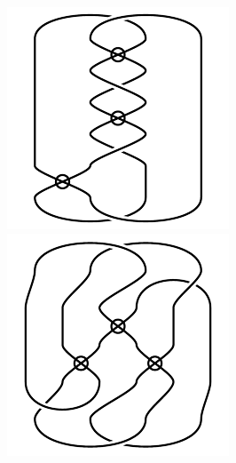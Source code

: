 \begin{figure}[H]
\begin{minipage}[b]{.18\linewidth}
\centering
\includegraphics[width=\linewidth]{../data/virtual_4_47.png}
\end{minipage}
\begin{minipage}[b]{.18\linewidth}
\centering
\includegraphics[width=\linewidth]{../data/virtual_4_48.png}

\end{minipage}
\end{figure}
